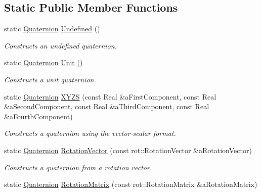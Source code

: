 \subsection*{Static Public Member Functions}
\begin{DoxyCompactItemize}
\item 
static \hyperlink{classlibrary_1_1math_1_1geom_1_1trf_1_1rot_1_1_quaternion}{Quaternion} \hyperlink{classlibrary_1_1math_1_1geom_1_1trf_1_1rot_1_1_quaternion_aec27bd02d37ecfd50335d8f05978f4ba}{Undefined} ()
\begin{DoxyCompactList}\small\item\em Constructs an undefined quaternion. \end{DoxyCompactList}\item 
static \hyperlink{classlibrary_1_1math_1_1geom_1_1trf_1_1rot_1_1_quaternion}{Quaternion} \hyperlink{classlibrary_1_1math_1_1geom_1_1trf_1_1rot_1_1_quaternion_a27ad3f214371f7b566b1a4b75dcf9d0e}{Unit} ()
\begin{DoxyCompactList}\small\item\em Constructs a unit quaternion. \end{DoxyCompactList}\item 
static \hyperlink{classlibrary_1_1math_1_1geom_1_1trf_1_1rot_1_1_quaternion}{Quaternion} \hyperlink{classlibrary_1_1math_1_1geom_1_1trf_1_1rot_1_1_quaternion_ad6426210c54c79fc5296b5375380a7ca}{X\+Y\+ZS} (const Real \&a\+First\+Component, const Real \&a\+Second\+Component, const Real \&a\+Third\+Component, const Real \&a\+Fourth\+Component)
\begin{DoxyCompactList}\small\item\em Constructs a quaternion using the vector-\/scalar format. \end{DoxyCompactList}\item 
static \hyperlink{classlibrary_1_1math_1_1geom_1_1trf_1_1rot_1_1_quaternion}{Quaternion} \hyperlink{classlibrary_1_1math_1_1geom_1_1trf_1_1rot_1_1_quaternion_a0580b35480348ca136deb7e295043d69}{Rotation\+Vector} (const rot\+::\+Rotation\+Vector \&a\+Rotation\+Vector)
\begin{DoxyCompactList}\small\item\em Constructs a quaternion from a rotation vector. \end{DoxyCompactList}\item 
static \hyperlink{classlibrary_1_1math_1_1geom_1_1trf_1_1rot_1_1_quaternion}{Quaternion} \hyperlink{classlibrary_1_1math_1_1geom_1_1trf_1_1rot_1_1_quaternion_af90f6ceb1d4840732eebceaa31143476}{Rotation\+Matrix} (const rot\+::\+Rotation\+Matrix \&a\+Rotation\+Matrix)

\end{DoxyCompactItemize}
